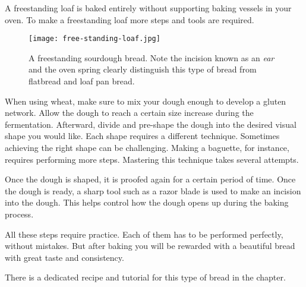 A freestanding loaf is baked entirely without supporting
baking vessels in your oven. To make a freestanding loaf more steps
and tools are required.

\begin{figure}[!htb]
\centering
  \texttt{[image: free-standing-loaf.jpg]}
  \caption[Freestanding sourdough bread]{A freestanding sourdough bread. Note
      the incision known as an \emph{ear} and the oven spring clearly
      distinguish this type of bread from flatbread and loaf pan bread.}
\end{figure}

When using wheat, make sure to mix your dough enough to develop a gluten network.
Allow the dough to reach a certain size increase during the fermentation.
Afterward, divide and pre-shape the dough into the desired visual shape you
would like. Each shape requires a different technique. Sometimes achieving
the right shape can be challenging. Making a baguette, for instance,
requires performing more steps. Mastering this technique takes several attempts.

Once the dough is shaped, it is proofed again for a certain
period of time. Once the dough is ready, a sharp tool such
as a razor blade is used to make an incision into the dough.
This helps control how the dough opens up during the baking process.

All these steps require practice. Each of them has to be
performed perfectly, without mistakes.
But after baking you will be rewarded with a beautiful bread
with great taste and consistency.

There is a dedicated recipe and tutorial for this type of bread in the
 chapter.
